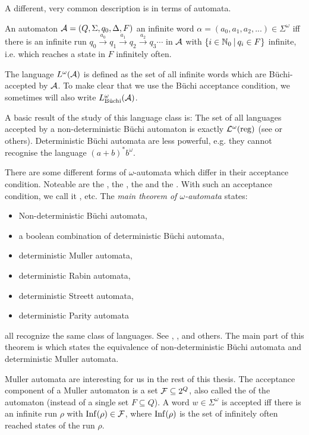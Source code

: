 A different, very common description is in terms of automata.

An automaton $\mathcal{A} = (Q, \Sigma, q_0, \Delta, F)$  an infinite word $\alpha = (a_0,a_1,a_2,...) \in \Sigma^\omega$ iff there is an infinite run $q_0 \xrightarrow{a_0} q_1 \xrightarrow{a_1} q_2 \xrightarrow{a_2} q_3 \cdots$ in $\mathcal{A}$ with $\Set{ i \in \N_0 }{ q_i \in F }$ infinite, i.e. which reaches a state in $F$ infinitely often.

The language $L^\omega(\mathcal{A})$ is defined as the set of all infinite words which are Büchi-accepted by  $\mathcal{A}$. To make clear that we use the Büchi acceptance condition, we sometimes will also write $L^\omega_\text{Büchi}(\mathcal{A})$.

A basic result of the study of this language class is: The set of all languages accepted by a non-deterministic Büchi automaton is exactly $\mathcal{L}^\omega(\textup{\textrm{reg}})$ (see \cite{InfCompR101} or others). %
Deterministic Büchi automata are less powerful, e.g. they cannot recognise the language $(a+b)^* b^\omega$.

There are some different forms of $\omega$-automata which differ in their acceptance condition. Noteable are the , the , the  and the . With such an acceptance condition, we call it , etc. The \emph{main theorem of $\omega$-automata} states:
\begin{itemize}
\item Non-deterministic Büchi automata,
\item a boolean combination of deterministic Büchi automata,
\item deterministic Muller automata,
\item deterministic Rabin automata,
\item deterministic Streett automata,
\item deterministic Parity automata
\end{itemize}
all recognize the same class of languages. See \cite{InfCompR101}, \cite{LangAutLogicR102}, \cite{InfWordsR110} and others. The main part of this theorem is  which states the equivalence of non-deterministic Büchi automata and deterministic Muller automata.

Muller automata are interesting for us in the rest of this thesis. The acceptance component of a Muller automaton is a set $\mathcal{F} \subseteq 2^Q$, also called the  of the automaton (instead of a single set $F \subseteq Q$). A word $w \in \Sigma^\omega$ is accepted iff there is an infinite run $\rho$ with $\operatorname{Inf}(\rho) \in \mathcal{F}$, where $\operatorname{Inf}(\rho)$ is the set of infinitely often reached states of the run $\rho$.

